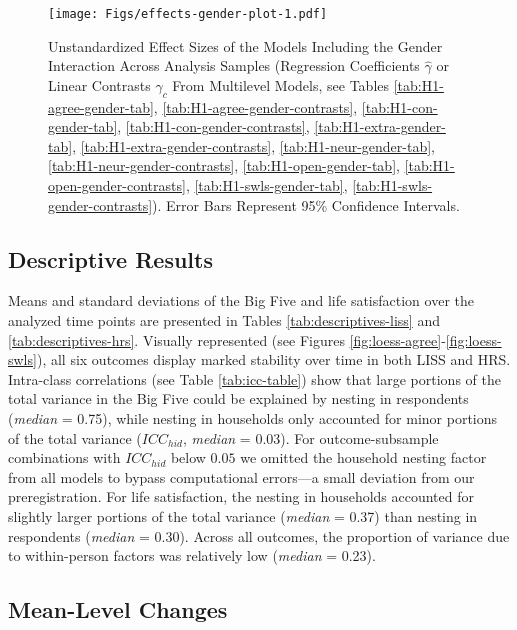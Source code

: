 \documentclass[
  english,
  man, noextraspace,floatsintext]{apa7}
\begin{document}
\begin{figure}
\centering
\texttt{[image: Figs/effects-gender-plot-1.pdf]}
\caption{\label{fig:effects-gender-plot}Unstandardized Effect Sizes of the Models Including the Gender Interaction Across Analysis Samples (Regression Coefficients \(\hat{\gamma}\) or Linear Contrasts \(\hat{\gamma}_{c}\) From Multilevel Models, see Tables \ref{tab:H1-agree-gender-tab}, \ref{tab:H1-agree-gender-contrasts}, \ref{tab:H1-con-gender-tab}, \ref{tab:H1-con-gender-contrasts}, \ref{tab:H1-extra-gender-tab}, \ref{tab:H1-extra-gender-contrasts}, \ref{tab:H1-neur-gender-tab}, \ref{tab:H1-neur-gender-contrasts}, \ref{tab:H1-open-gender-tab}, \ref{tab:H1-open-gender-contrasts}, \ref{tab:H1-swls-gender-tab}, \ref{tab:H1-swls-gender-contrasts}). Error Bars Represent 95\% Confidence Intervals.}
\end{figure}

\hypertarget{descriptive-results}{%
\subsection{Descriptive Results}\label{descriptive-results}}

Means and standard deviations of the Big Five and life satisfaction over the analyzed time points are presented in Tables \ref{tab:descriptives-liss} and \ref{tab:descriptives-hrs}. Visually represented (see Figures \ref{fig:loess-agree}-\ref{fig:loess-swls}), all six outcomes display marked stability over time in both LISS and HRS. Intra-class correlations (see Table \ref{tab:icc-table}) show that large portions of the total variance in the Big Five could be explained by nesting in respondents (\emph{median} = 0.75), while nesting in households only accounted for minor portions of the total variance (\(ICC_{hid}\), \emph{median} = 0.03). For outcome-subsample combinations with \(ICC_{hid}\) below \(0.05\) we omitted the household nesting factor from all models to bypass computational errors---a small deviation from our preregistration. For life satisfaction, the nesting in households accounted for slightly larger portions of the total variance (\emph{median} = 0.37) than nesting in respondents (\emph{median} = 0.30). Across all outcomes, the proportion of variance due to within-person factors was relatively low (\emph{median} = 0.23).

\hypertarget{mean-level-changes}{%
\subsection{Mean-Level Changes}\label{mean-level-changes}}
\end{document}
